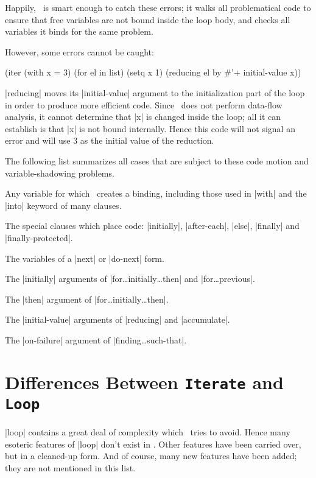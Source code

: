 Happily, \iter\ is smart enough to catch these errors; it
walks all problematical code to ensure that free variables are not
bound inside the loop body, and checks all variables it binds for the
same problem.

However, some errors cannot be caught:

\begin{program}
(iter (with x = 3)
      (for el in list)
      (setq x 1)
      (reducing el by \#'+ initial-value x))
\end{program}
|reducing| moves its |initial-value| argument to the initialization
part of the loop in order to produce more efficient code.  Since
\iter\ does not perform data-flow analysis, it cannot determine that
|x| is changed inside the loop; all it can establish is that |x| is
not bound internally.  Hence this code will not signal an
error and will use $3$ as the initial value of the reduction.

The following list summarizes all cases that are subject to these code
motion and variable-shadowing problems.
\begin{itemize}
\item Any variable for which \iter\ creates a binding, including those
used in |with| and the |into| keyword of many clauses.

\begin{sloppypar}
\item The special clauses which place code: |initially|, |after-each|, |else|,
|finally| and |finally-protected|. 
\end{sloppypar}

\item The variables of a |next| or |do-next| form.

\item The |initially| arguments of |for\dots initially\dots then| and
|for\dots previous|. 

\item The |then| argument of |for\dots initially\dots then|.

\item The |initial-value| arguments of |reducing| and |accumulate|.

\item The |on-failure| argument of |finding\dots such-that|.
\end{itemize}

\section{Differences Between {\tt Iterate} and {\tt Loop}}
|loop| contains a great deal of complexity which \iter\ tries to
avoid.  Hence many esoteric features of |loop| don't exist in \iter.
Other features have been carried over, but in a cleaned-up form.  
And of course, many new features have been added; they are not
mentioned in this list.

